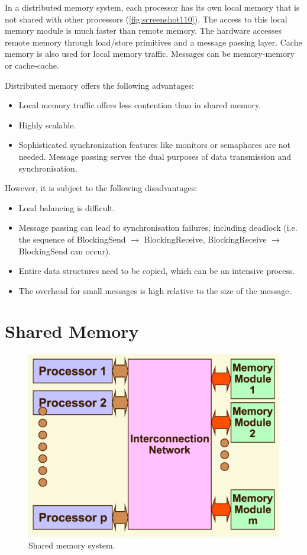 In a distributed memory system, each processor has its own local memory that is not shared with other processors (\autoref{fig:screenshot110}). The access to this local memory module is much faster than remote memory. The hardware accesses remote memory through load/store primitives and a message passing layer. Cache memory is also used for local memory traffic. Messages can be memory-memory or cache-cache.

Distributed memory offers the following advantages: \begin{itemize}
\item Local memory traffic offers less contention than in shared memory.
\item Highly scalable.
\item Sophisticated synchronization features like monitors or semaphores are not needed. Message passing serves the dual purposes of data transmission and synchronisation.
\end{itemize}

However, it is subject to the following disadvantages: \begin{itemize}
\item Load balancing is difficult.
\item Message passing can lead to synchronisation failures, including deadlock (i.e. the sequence of BlockingSend $\rightarrow$ BlockingReceive, BlockingReceive $\rightarrow$ BlockingSend can occur).
\item Entire data structures need to be copied, which can be an intensive process.
\item The overhead for small messages is high relative to the size of the message.
\end{itemize}

\section{Shared Memory}
\begin{figure}
\centering
\includegraphics[width=0.7\linewidth]{figures/screenshot111}
\caption{Shared memory system.}
\label{fig:screenshot111}
\end{figure}


